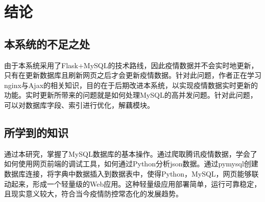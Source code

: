 \chapter{结论}

\section{本系统的不足之处}

由于本系统采用了Flask+MySQL的技术路线，因此疫情数据并不会实时地更新，只有在更新数据库且刷新网页之后才会更新疫情数据。针对此问题，作者正在学习nginx与Ajax的相关知识，目的在于后期改进本系统，以实现疫情数据实时更新的功能。实时更新所带来的问题就是如何处理MySQL的高并发问题。\citep{翁志宁2016flask}针对此问题，可以对数据库字段、索引进行优化，解藕模块。\citep{牛作东2019基于}

\section{所学到的知识}

通过本研究，掌握了MySQL数据库的基本操作。通过爬取腾讯疫情数据，学会了如何使用网页前端的调试工具，如何通过Python分析json数据。通过pymysql创建数据库连接，将字典中数据插入到数据表中，使得Python，MySQL，网页能够联动起来，形成一个轻量级的Web应用。这种轻量级应用部署简单，运行可靠稳定，且现实意义较大，符合当今疫情防控常态化的发展趋势。\citep{虞乔木2020新冠肺炎疫情防控常态化研究}





